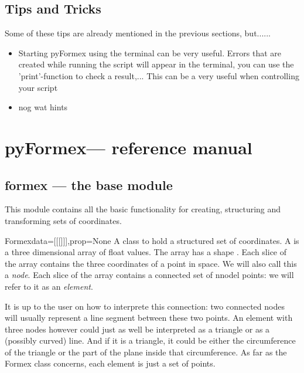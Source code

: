 \documentclass[a4paper]{manual}
\newcommand{\pyformex}{pyFormex\xspace}
\begin{document}
{%
\section{Tips and Tricks}

Some of these tips are already mentioned in the previous sections, but......
\begin{itemize}
\item Starting \pyformex using the terminal can be very useful. Errors that are created while running the script will appear in the terminal, you can use the 'print'-function to check a result,... This can be a very useful when controlling your script
\item nog wat hints 
\end{itemize}





\chapter{\pyformex --- reference manual}
{\label{cha:reference}

\section{formex --- the base module}
{\label{sec:formex}

This module contains all the basic functionality for creating, structuring and transforming sets of coordinates.

\begin{classdesc}  {Formex}{data=[[[]]],prop=None}
A class to hold a structured set of coordinates. A  is a three dimensional array of float values. The array has a shape . Each slice \code{[i,j]} of the array contains the three coordinates of a point in space. We will also call this a \emph{node}. Each slice \code{[i]} of the array contains a connected set of nnodel points: we will refer to it as an \emph{element}. 

It is up to the user on how to interprete this connection: two connected nodes will usually represent a line segment between these two points. An element with three nodes however could just as well be interpreted as a triangle or as a (possibly curved) line. And if it is a triangle, it could be either the circumference of the triangle or the part of the plane inside that circumference. As far as the Formex class concerns, each element is just a set of points. 


\end{classdesc}}}}
\end{document}
